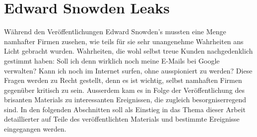 \newpage
\section{Edward Snowden Leaks}
Während den Veröffentlichungen Edward Snowden's mussten eine Menge namhafter Firmen zusehen, wie teils für sie sehr unangenehme Wahrheiten ans Licht gebracht wurden. Wahrheiten, die wohl selbst treue Kunden nachgedenklich gestimmt haben: Soll ich denn wirklich noch meine E-Mails bei Google verwalten? Kann ich noch im Internet surfen, ohne ausspioniert zu werden? Diese Fragen werden zu Recht gestellt, denn es ist wichtig, selbst namhaften Firmen gegenüber kritisch zu sein. Ausserdem kam es in Folge der Veröffentlichung des brisanten Materials zu interessanten Ereignissen, die zugleich besorgniserregend sind. In den folgenden Abschnitten soll als Einstieg in das Thema dieser Arbeit detaillierter auf Teile des veröffentlichten Materials und bestimmte Ereignisse eingegangen werden.

